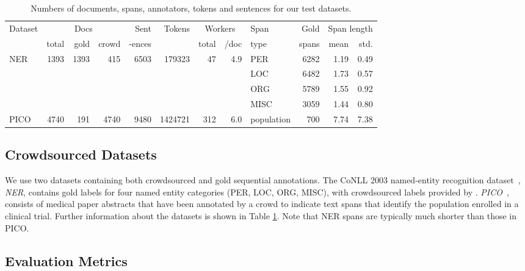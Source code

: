 \begin{table}
\small
\begin{tabular}{| l || r | r | r | r | r || r | r || l | r | r | r |} \hline
Dataset & \multicolumn{3}{c|}{Docs} & Sent & Tokens & \multicolumn{2}{c||}{Workers} & Span & Gold & \multicolumn{2}{c|}{Span length}  \\
 & total & gold & crowd & -ences & & total & /doc & type & spans & mean & std.  \\
\hline
NER & 1393 & 1393 & 415 & 6503 & 179323  & 47 & 4.9 & PER & 6282 & 1.19 & 0.49 \\
       & & & & & & &  & LOC  & 6482 & 1.73 & 0.57\\
       & & & & & & & & ORG  & 5789 & 1.55 & 0.92\\
       & & & & & & & & MISC & 3059 & 1.44 & 0.80\\ \hline
PICO & 4740 & 191 & 4740 & 9480 & 1424721 & 312 & 6.0 & population & 700 & 7.74 & 7.38  \\ \hline
\end{tabular}
\label{tab:datasets}
\caption{Numbers of documents, spans, annotators, tokens and sentences for our test datasets.}
\end{table}


\subsection{Crowdsourced Datasets}\label{sec:expts}

We use two datasets containing both crowdsourced and gold sequential annotations. 
The CoNLL 2003 named-entity recognition dataset~\cite{tjong2003introduction},
\emph{NER}, contains gold labels for four named entity categories (PER, LOC, ORG, MISC),
with crowdsourced labels provided by \cite{rodrigues2014sequence}.
\emph{PICO}~\cite{nguyen2017aggregating}, 
consists of medical paper abstracts that have been annotated by a crowd to indicate text spans that identify the population enrolled in a clinical trial. 
Further information about the datasets is shown in Table \ref{tab:datasets}. Note that NER spans are typically much shorter than those in PICO.

\subsection{Evaluation Metrics}

